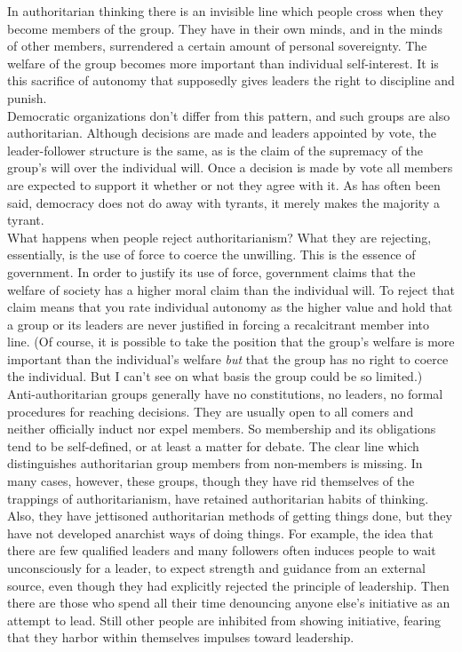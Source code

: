 In authoritarian thinking there is an invisible line which people cross when they become members of the group. They have in their own minds, and in the minds of other members, surrendered a certain amount of personal sovereignty. The welfare of the group becomes more important than individual self-interest. It is this sacrifice of autonomy that supposedly gives leaders the right to discipline and punish.\\
Democratic organizations don't differ from this pattern, and such groups are also authoritarian. Although decisions are made and leaders appointed by vote, the leader-follower structure is the same, as is the claim of the supremacy of the group's will over the individual will. Once a decision is made by vote all members are expected to support it whether or not they agree with it. As has often been said, democracy does not do away with tyrants, it merely makes the majority a tyrant.\\
What happens when people reject authoritarianism? What they are rejecting, essentially, is the use of force to coerce the unwilling. This is the essence of government. In order to justify its use of force, government claims that the welfare of society has a higher moral claim than the individual will. To reject that claim means that you rate individual autonomy as the higher value and hold that a group or its leaders are never justified in forcing a recalcitrant member into line. (Of course, it is possible to take the position that the group's welfare is more important than the individual's welfare \emph{but} that the group has no right to coerce the individual. But I can't see on what basis the group could be so limited.)\\
Anti-authoritarian groups generally have no constitutions, no leaders, no formal procedures for reaching decisions. They are usually open to all comers and neither officially induct nor expel members. So membership and its obligations tend to be self-defined, or at least a matter for debate. The clear line which distinguishes authoritarian group members from non-members is missing. In many cases, however, these groups, though they have rid themselves of the trappings of authoritarianism, have retained authoritarian habits of thinking. Also, they have jettisoned authoritarian methods of getting things done, but they have not developed anarchist ways of doing things. For example, the idea that there are few qualified leaders and many followers often induces people to wait unconsciously for a leader, to expect strength and guidance from an external source, even though they had explicitly rejected the principle of leadership. Then there are those who spend all their time denouncing anyone else's initiative as an attempt to lead. Still other people are inhibited from showing initiative, fearing that they harbor within themselves impulses toward leadership.\\
